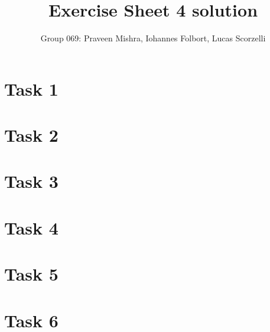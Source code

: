 \documentclass[
	11pt, 
	DIV10,
	a4paper, 
	oneside, 
	headings=normal, 
	captions=tableheading,
	final, 
	numbers=noenddot
]{scrartcl}
\title{Exercise Sheet 4 solution}
\author{Group 069: Praveen Mishra, Iohannes Folbort, Lucas Scorzelli}
\begin{document}
\maketitle
\newpage



\section*{Task 1}

\newpage

\section*{Task 2}

\newpage

\section*{Task 3}

\newpage

\section*{Task 4}

\newpage

\section*{Task 5}

\newpage

\section*{Task 6}

\newpage
\end{document}
